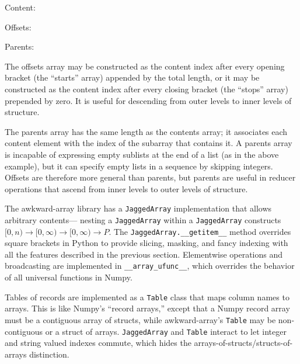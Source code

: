 \documentclass{webofc}
\begin{document}
\vspace{0.05 cm}
Content:           \tabto{4 cm}{\ttfamily\verb|[ |\textcolor{darkblue}{0, 1, 2}\verb|,       |\textcolor{darkblue}{3, 4}\verb|,   |\textcolor{darkblue}{5, 6, 7, 8}\verb|]|}

\vspace{0.05 cm}
Offsets:           \tabto{4 cm}{\ttfamily\verb|[|\textcolor{red}{0,}\verb|         |\textcolor{red}{3,}\verb|  |\textcolor{red}{3,}\verb|      |\textcolor{red}{5,}\verb|            |\textcolor{red}{10, 10}\verb|]|}

\vspace{0.05 cm}
Parents:           \tabto{4 cm}{\ttfamily\verb|[ |\textcolor{darkgreen}{0, 0, 0}\verb|        |\textcolor{purple}{2, 2,}\verb|   |\textcolor{darkorange}{3, 3, 3, 3}\verb|]|}

\vspace{\baselineskip}
The offsets array may be constructed as the content index after every opening bracket (the ``starts'' array) appended by the total length, or it may be constructed as the content index after every closing bracket (the ``stops'' array) prepended by zero. It is useful for descending from outer levels to inner levels of structure.

The parents array has the same length as the contents array; it associates each content element with the index of the subarray that contains it. A parents array is incapable of expressing empty sublists at the end of a list (as in the above example), but it can specify empty lists in a sequence by skipping integers. Offsets are therefore more general than parents, but parents are useful in reducer operations that ascend from inner levels to outer levels of structure. 

The awkward-array library has a {\tt\small JaggedArray} implementation that allows arbitrary contents--- nesting a {\tt\small JaggedArray} within a {\tt\small JaggedArray} constructs $[0, n) \to [0, \infty) \to [0, \infty) \to P$. The {\tt\small JaggedArray.\_\_getitem\_\_} method overrides square brackets in Python to provide slicing, masking, and fancy indexing with all the features described in the previous section. Elementwise operations and broadcasting are implemented in {\tt\small \_\_array\_ufunc\_\_}, which overrides the behavior of all universal functions in Numpy.

Tables of records are implemented as a {\tt\small Table} class that maps column names to arrays. This is like Numpy's ``record arrays,'' except that a Numpy record array must be a contiguous array of structs, while awkward-array's {\tt\small Table} may be non-contiguous or a struct of arrays. {\tt\small JaggedArray} and {\tt\small Table} interact to let integer and string valued indexes commute, which hides the arrays-of-structs/structs-of-arrays distinction.
\end{document}

